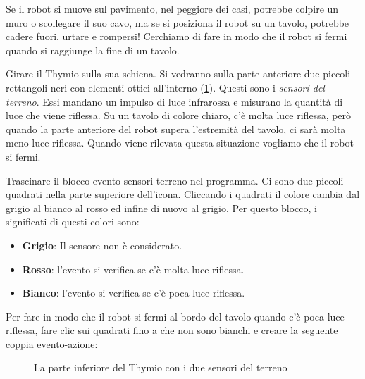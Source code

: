 
Se il robot si muove sul pavimento, nel peggiore dei casi, potrebbe colpire un muro o scollegare il
suo cavo, ma se si posiziona il robot su un tavolo, potrebbe cadere
fuori, urtare e rompersi! Cerchiamo di fare in modo che il robot si fermi quando si
raggiunge la fine di un tavolo.


Girare il Thymio sulla sua schiena. Si vedranno sulla parte anteriore due piccoli
rettangoli neri con elementi ottici all'interno (\cref{fig.bottom}).
Questi sono i \emph{sensori del terreno}.
Essi mandano un impulso di luce infrarossa e misurano la quantità di luce che viene riflessa.
Su un tavolo di colore chiaro, c'è molta luce riflessa, però quando la parte anteriore del robot supera l'estremità del tavolo, ci sarà molta meno luce riflessa. Quando viene
rilevata questa situazione vogliamo che il robot si fermi.


Trascinare il blocco evento sensori terreno  nel programma. Ci
sono due piccoli quadrati nella parte superiore dell'icona. Cliccando i quadrati
il colore cambia dal grigio al bianco al rosso ed infine di nuovo al grigio.
Per questo blocco, i significati di questi colori sono:

\begin{itemize}
\item \textbf{Grigio}: Il sensore non è considerato.
\item \textbf{Rosso}: l'evento si verifica se c'è molta luce riflessa.
\item \textbf{Bianco}: l'evento si verifica se c'è poca luce riflessa.
\end{itemize}


Per fare in modo che il robot si fermi al bordo del tavolo quando c'è poca luce riflessa, fare clic sui quadrati fino a che non sono bianchi e creare la seguente coppia evento-azione:

\begin{figure}
\begin{center}
\caption{La parte inferiore del Thymio con i due sensori del terreno}\label{fig.bottom}
\end{center}
\end{figure}

